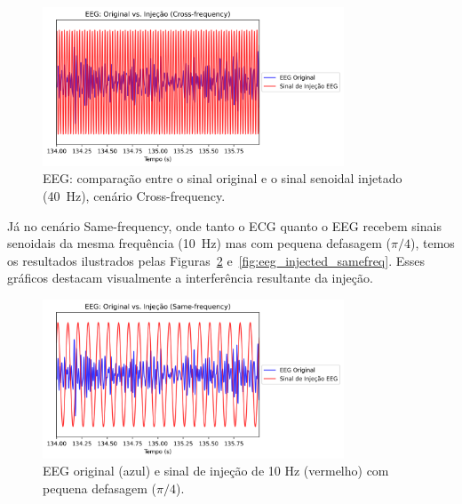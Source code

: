 \begin{figure}[htb]
    \centering
    \includegraphics[width=0.8\textwidth]{figs/3_2_testing_connectivity_metrics/3_EEG_Original_vs_Injecao_Cross-frequency.png}
    \caption{EEG: comparação entre o sinal original e o sinal senoidal injetado (40~Hz), cenário Cross-frequency.}
    \label{fig:eeg_injection}
\end{figure}

Já no cenário Same-frequency, onde tanto o ECG quanto o EEG recebem sinais senoidais da mesma frequência (10~Hz) mas com pequena defasagem (\(\pi/4\)), temos os resultados ilustrados pelas Figuras~\ref{fig:eeg_original_vs_injection_samefreq} e~\ref{fig:eeg_injected_samefreq}. Esses gráficos destacam visualmente a interferência resultante da injeção.

\begin{figure}[htb]
    \centering
    \includegraphics[width=0.8\textwidth]{figs/3_2_testing_connectivity_metrics/10_EEG_Original_vs_Injecao_Same-frequency.png}
    \caption{EEG original (azul) e sinal de injeção de 10 Hz (vermelho) com pequena defasagem (\(\pi/4\)).}
    \label{fig:eeg_original_vs_injection_samefreq}
\end{figure}

